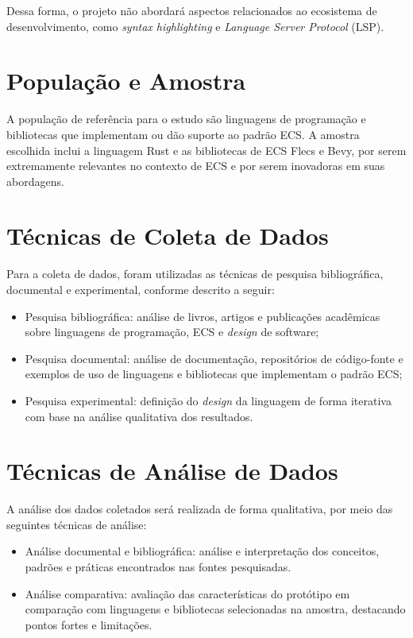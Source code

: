 Dessa forma, o projeto não abordará aspectos relacionados ao ecosistema de desenvolvimento, como \textit{syntax highlighting} e \textit{Language Server Protocol} (LSP).

\section{População e Amostra}

A população de referência para o estudo são linguagens de programação e bibliotecas que implementam ou dão suporte ao padrão ECS. A amostra escolhida inclui a linguagem Rust e as bibliotecas de ECS Flecs e Bevy, por serem extremamente relevantes no contexto de ECS e por serem inovadoras em suas abordagens.

\section{Técnicas de Coleta de Dados}

Para a coleta de dados, foram utilizadas as técnicas de pesquisa bibliográfica, documental e experimental, conforme descrito a seguir:

\begin{itemize}
    \item Pesquisa bibliográfica: análise de livros, artigos e publicações acadêmicas sobre linguagens de programação, ECS e \textit{design} de software;
    \item Pesquisa documental: análise de documentação, repositórios de código-fonte e exemplos de uso de linguagens e bibliotecas que implementam o padrão ECS;
    \item Pesquisa experimental: definição do \textit{design} da linguagem de forma iterativa com base na análise qualitativa dos resultados.
\end{itemize}

\section{Técnicas de Análise de Dados}

A análise dos dados coletados será realizada de forma qualitativa, por meio das seguintes técnicas de análise:

\begin{itemize}
    \item Análise documental e bibliográfica: análise e interpretação dos conceitos, padrões e práticas encontrados nas fontes pesquisadas.
    \item Análise comparativa: avaliação das características do protótipo em comparação com linguagens e bibliotecas selecionadas na amostra, destacando pontos fortes e limitações.
\end{itemize}

